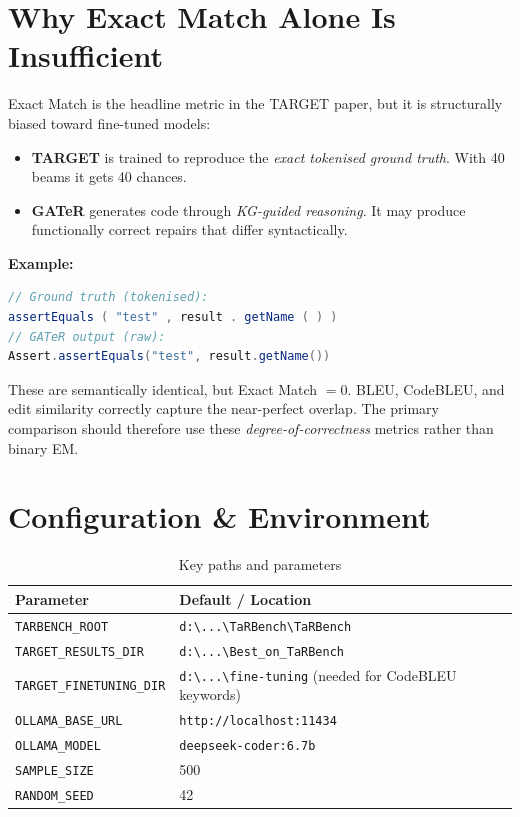 \documentclass[11pt,a4paper]{article}
\begin{document}
\section{Why Exact Match Alone Is Insufficient}

Exact Match is the headline metric in the TARGET paper, but it is
structurally biased toward fine-tuned models:

\begin{itemize}
    \item \textbf{TARGET} is trained to reproduce the \emph{exact tokenised
          ground truth}. With 40 beams it gets 40 chances.
    \item \textbf{GATeR} generates code through \emph{KG-guided reasoning}.
          It may produce functionally correct repairs that differ
          syntactically.
\end{itemize}

\textbf{Example:}
\begin{lstlisting}[language=Java]
// Ground truth (tokenised):
assertEquals ( "test" , result . getName ( ) )
// GATeR output (raw):
Assert.assertEquals("test", result.getName())
\end{lstlisting}

These are semantically identical, but Exact Match ${}= 0$.
BLEU, CodeBLEU, and edit similarity correctly capture the near-perfect
overlap. The primary comparison should therefore use these
\emph{degree-of-correctness} metrics rather than binary EM.

\section{Configuration \& Environment}

\begin{table}[h]
\centering
\caption{Key paths and parameters}
\renewcommand{\arraystretch}{1.15}
\begin{tabular}{@{}lp{8cm}@{}}
\toprule
\textbf{Parameter} & \textbf{Default / Location} \\
\midrule
\texttt{TARBENCH\_ROOT} & \texttt{d:\textbackslash ...\textbackslash TaRBench\textbackslash TaRBench} \\
\texttt{TARGET\_RESULTS\_DIR} & \texttt{d:\textbackslash ...\textbackslash Best\_on\_TaRBench} \\
\texttt{TARGET\_FINETUNING\_DIR} & \texttt{d:\textbackslash ...\textbackslash fine-tuning}
    (needed for CodeBLEU keywords) \\
\texttt{OLLAMA\_BASE\_URL} & \texttt{http://localhost:11434} \\
\texttt{OLLAMA\_MODEL} & \texttt{deepseek-coder:6.7b} \\
\texttt{SAMPLE\_SIZE} & 500 \\
\texttt{RANDOM\_SEED} & 42 \\
\bottomrule
\end{tabular}
\end{table}
\end{document}
